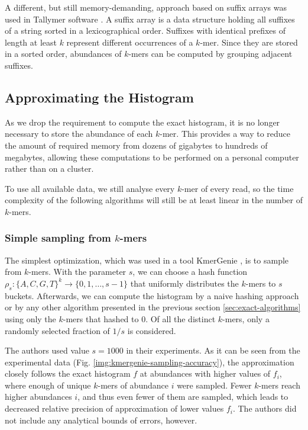 A different, but still memory-demanding, approach based on suffix arrays was
used in Tallymer software \cite{Kurtz2008}. A suffix array is a data structure
holding all suffixes of a string sorted in a lexicographical order. Suffixes with identical
prefixes of length at least $k$ represent different occurrences of a $k$-mer. Since
they are stored in a sorted order, abundances of $k$-mers can be computed by
grouping adjacent suffixes. 

\subsection{Approximating the Histogram}
As we drop the requirement to compute the exact histogram, it is no longer necessary to
store the abundance of each $k$-mer. This provides a way to reduce the amount of required
memory from dozens of gigabytes to hundreds of megabytes, allowing these computations to
be performed on a personal computer rather than on a cluster.  

To use all available data, we still analyse every $k$-mer of every read, so the
time complexity of the following algorithms will still be at least
linear in the number of $k$-mers.

\subsubsection{Simple sampling from $k$-mers}
\label{sec:simple-sampling}
The simplest optimization, which was used in a tool KmerGenie \cite{Chikhi2013},
is to sample from $k$-mers. With the parameter $s$, we can choose a hash function 
$\rho_s: \{A,C,G,T\}^k \rightarrow \{0, 1, \dots, s-1\}$ that uniformly distributes
the $k$-mers to $s$ buckets. Afterwards, we can compute the histogram by a naive
hashing approach or by any other algorithm presented in the previous section
\ref{sec:exact-algorithms} using only the $k$-mers that hashed to 0. 
Of all the distinct $k$-mers, only a randomly selected fraction of $1/s$ is considered.

The authors used value $s=1000$ in their experiments. As it can be seen from the
experimental data (Fig. \ref{img:kmergenie-sampling-accuracy}), the approximation closely
follows the exact histogram $f$ at abundances with higher values of $f_i$, where enough
of unique $k$-mers of abundance $i$ were sampled. Fewer $k$-mers reach higher abundances
$i$, and thus even fewer of them are sampled, which leads to decreased relative precision
of approximation of lower values $f_i$. The authors did not include 
any analytical bounds of errors, however.

